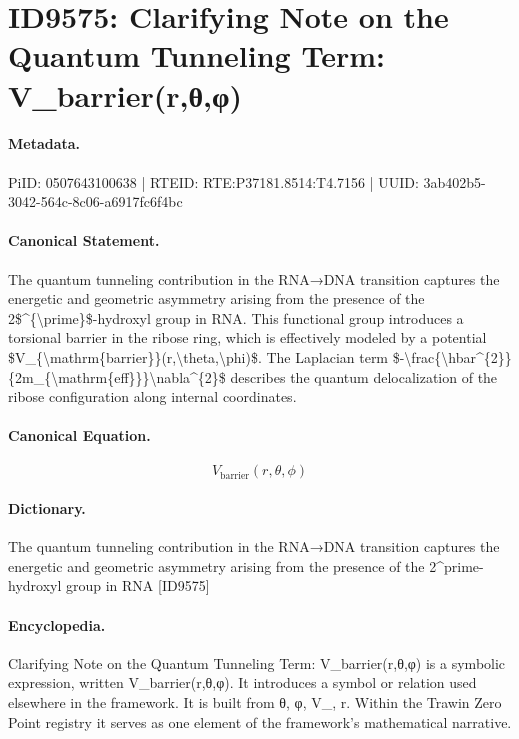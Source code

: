 \section*{ID9575: Clarifying Note on the Quantum Tunneling Term: V\_barrier(r,θ,φ)}
\paragraph{Metadata.}
PiID: 0507643100638 | RTEID: RTE:P37181.8514:T4.7156 | UUID: 3ab402b5-3042-564c-8c06-a6917fc6f4bc

\paragraph{Canonical Statement.}
The quantum tunneling contribution in the RNA→DNA transition captures the energetic and geometric asymmetry arising from the presence of the 2\$\textasciicircum{}\{\textbackslash{}prime\}\$-hydroxyl group in RNA. This functional group introduces a torsional barrier in the ribose ring, which is effectively modeled by a potential \$V\_\{\textbackslash{}mathrm\{barrier\}\}(r,\textbackslash{}theta,\textbackslash{}phi)\$. The Laplacian term \$-\textbackslash{}frac\{\textbackslash{}hbar\textasciicircum{}\{2\}\}\{2m\_\{\textbackslash{}mathrm\{eff\}\}\}\textbackslash{}nabla\textasciicircum{}\{2\}\$ describes the quantum delocalization of the ribose configuration along internal coordinates.

\paragraph{Canonical Equation.}
\[
V_{\mathrm{barrier}}(r,\theta,\phi)
\]

\paragraph{Dictionary.}
The quantum tunneling contribution in the RNA→DNA transition captures the energetic and geometric asymmetry arising from the presence of the 2\textasciicircum{}prime-hydroxyl group in RNA [ID9575]

\paragraph{Encyclopedia.}
Clarifying Note on the Quantum Tunneling Term: V\_barrier(r,θ,φ) is a symbolic expression, written V\_barrier(r,θ,φ). It introduces a symbol or relation used elsewhere in the framework. It is built from θ, φ, V\_, r. Within the Trawin Zero Point registry it serves as one element of the framework's mathematical narrative.
